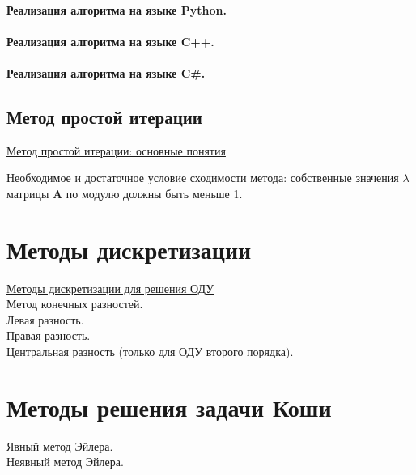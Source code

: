 \documentclass[12pt]{article}
\begin{document}
\paragraph{Реализация алгоритма на языке Python.}

\paragraph{Реализация алгоритма на языке C++.}

\paragraph{Реализация алгоритма на языке C\#.}

\subsection{Метод простой итерации}

\href{https://zaochnik.com/spravochnik/matematika/issledovanie-slau/iteratsionnye-metody-reshenija-slau/}{Метод простой итерации: основные понятия}

Необходимое и достаточное условие сходимости метода: собственные значения $\lambda$ матрицы \textbf{A} по модулю должны быть меньше 1.


\section{Методы дискретизации}

\href{https://studfile.net/preview/5829857/}{Методы дискретизации для решения ОДУ}\\

Метод конечных разностей.\\

Левая разность.\\

Правая разность.\\

Центральная разность (только для ОДУ второго порядка).\\


\section{Методы решения задачи Коши}


Явный метод Эйлера.\\

Неявный метод Эйлера.
\end{document}
